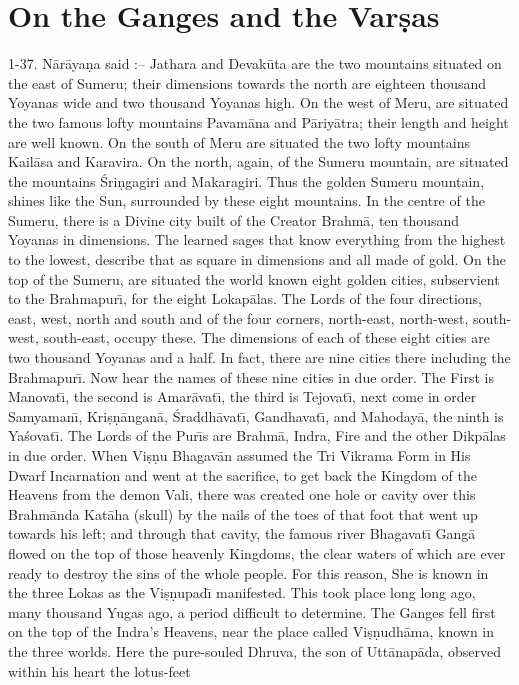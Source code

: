 \chapter{On the Ganges and the Var\d{s}as}

1-37. N\=ar\=aya\d{n}a said :-- Jathara and Devak\=uta are the two mountains situated on the east of Sumeru; their dimensions towards the north are eighteen thousand Yoyanas wide and two thousand Yoyanas high. On the west of Meru, are situated the two famous lofty mountains Pavam\=ana and P\=ariy\=atra; their length and height are well known. On the south of Meru are situated the two lofty mountains Kail\=asa and Karavira. On the north, again, of the Sumeru mountain, are situated the mountains \'Sri\d{n}gagiri and Makaragiri. Thus the golden Sumeru mountain, shines like the Sun, surrounded by these eight mountains. In the centre of the Sumeru, there is a Divine city built of the Creator Brahm\=a, ten thousand Yoyanas in dimensions. The learned sages that know everything from the highest to the lowest, describe that as square in dimensions and all made of gold. On the top of the Sumeru, are situated the world known eight golden cities, subservient to the Brahmapur\={\i}, for the eight Lokap\=alas. The Lords of the four directions, east, west, north and south and of the four corners, north-east, north-west, south-west, south-east, occupy these. The dimensions of each of these eight cities are two thousand Yoyanas and a half. In fact, there are nine cities there including the Brahmapur\={\i}. Now hear the names of these nine cities in due order. The First is Manovat\={\i}, the second is Amar\=avat\={\i}, the third is Tejovat\={\i}, next come in order Samyaman\={\i}, Kri\d{s}\d{n}\=angan\=a, \'Sraddh\=avat\={\i}, Gandhavat\={\i}, and Mahoday\=a, the ninth is Ya\'sovat\={\i}. The Lords of the Pur\={\i}s are Brahm\=a, Indra, Fire and the other Dikp\=alas in due order. When Vi\d{s}\d{n}u Bhagav\=an assumed the Tri Vikrama Form in His Dwarf Incarnation and went at the sacrifice, to get back the Kingdom of the Heavens from the demon Vali, there was created one hole or cavity over this Brahm\=anda Kat\=aha (skull) by the nails of the toes of that foot that went up towards his left; and through that cavity, the famous river Bhagavat\={\i} Gang\=a flowed on the top of those heavenly Kingdoms, the clear waters of which are ever ready to destroy the sins of the whole people. For this reason, She is known in the three Lokas as the Vi\d{s}\d{n}upad\={\i} manifested. This took place long long ago, many thousand Yugas ago, a period difficult to determine. The Ganges fell first on the top of the Indra's Heavens, near the place called Vi\d{s}\d{n}udh\=ama, known in the three worlds. Here the pure-souled Dhruva, the son of Utt\=anap\=ada, observed within his heart the lotus-feet

